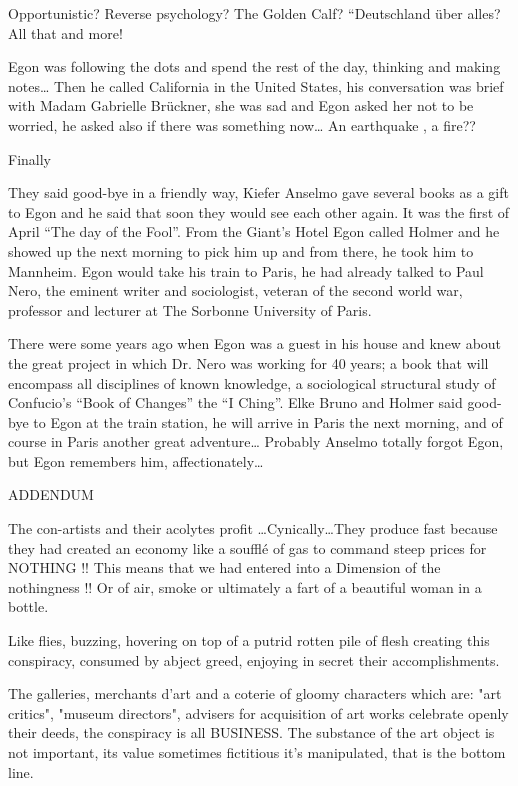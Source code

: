 \documentclass[smalldemyvopaper,11pt,twoside,onecolumn,openright,extrafontsizes]{memoir}
\begin{document}
Opportunistic? Reverse psychology? The Golden Calf? “Deutschland über alles? All that and more!

Egon was following the dots and spend the rest of the day, thinking and making notes… Then he called California in the United States, his conversation was brief with Madam Gabrielle Brückner, she was sad and Egon asked her not to be worried, he asked also if there was something now… An earthquake , a fire?? 

\begin{center}
    Finally
\end{center}

They said good-bye in a friendly way, Kiefer Anselmo gave several books as a gift to Egon and he said that soon they would see each other again. It was the first of April “The day of the Fool”. From the Giant’s Hotel Egon called Holmer and he showed up the next morning to pick him up and from there, he took him to Mannheim. Egon would take his train to Paris, he had already talked to Paul Nero, the eminent writer and sociologist, veteran of the second world war, professor and lecturer at The Sorbonne University of Paris. 

There were some years ago when Egon was a guest in his house and knew about the great project in which Dr. Nero was working for 40 years; a book that will encompass all disciplines of known knowledge, a sociological structural study of Confucio’s “Book of Changes” the “I Ching”. Elke Bruno and Holmer said good-bye to Egon at the train station, he will arrive in Paris the next morning, and of course in Paris another great adventure… Probably Anselmo totally forgot Egon, but Egon remembers him, affectionately…

\begin{center}
    ADDENDUM
\end{center}

The con-artists and their acolytes profit …Cynically…They produce fast because they had created an economy like a soufflé of gas to command steep prices for NOTHING !! This means that we  had entered into a Dimension of  the nothingness !! Or of air, smoke or ultimately a fart of a beautiful woman in a bottle.

Like flies, buzzing, hovering on top of a putrid rotten pile of flesh creating this conspiracy, consumed  by abject greed, enjoying in secret their accomplishments.

The galleries, merchants d’art  and a coterie of gloomy characters which are: "art critics", "museum directors", advisers for acquisition of art works celebrate  openly  their deeds, the conspiracy is all BUSINESS. The substance of the art object is not important, its value sometimes fictitious it’s manipulated, that is the bottom line.
\end{document}
